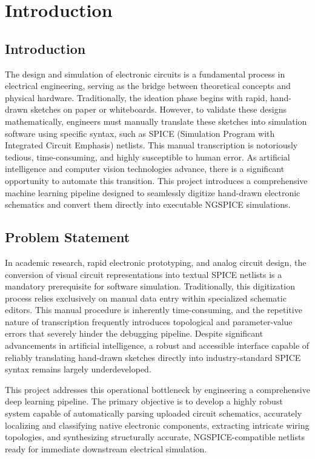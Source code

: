 \chapter{Introduction}
\section{Introduction}
The design and simulation of electronic circuits is a fundamental process in electrical engineering, serving as the bridge between theoretical concepts and physical hardware. Traditionally, the ideation phase begins with rapid, hand-drawn sketches on paper or whiteboards. However, to validate these designs mathematically, engineers must manually translate these sketches into simulation software using specific syntax, such as SPICE (Simulation Program with Integrated Circuit Emphasis) netlists. This manual transcription is notoriously tedious, time-consuming, and highly susceptible to human error. As artificial intelligence and computer vision technologies advance, there is a significant opportunity to automate this transition. This project introduces a comprehensive machine learning pipeline designed to seamlessly digitize hand-drawn electronic schematics and convert them directly into executable NGSPICE simulations.

\section{Problem Statement}
In academic research, rapid electronic prototyping, and analog circuit design, the conversion of visual circuit representations into textual SPICE netlists is a mandatory prerequisite for software simulation. Traditionally, this digitization process relies exclusively on manual data entry within specialized schematic editors. This manual procedure is inherently time-consuming, and the repetitive nature of transcription frequently introduces topological and parameter-value errors that severely hinder the debugging pipeline. Despite significant advancements in artificial intelligence, a robust and accessible interface capable of reliably translating hand-drawn sketches directly into industry-standard SPICE syntax remains largely underdeveloped. 

This project addresses this operational bottleneck by engineering a comprehensive deep learning pipeline. The primary objective is to develop a highly robust system capable of automatically parsing uploaded circuit schematics, accurately localizing and classifying native electronic components, extracting intricate wiring topologies, and synthesizing structurally accurate, NGSPICE-compatible netlists ready for immediate downstream electrical simulation.


